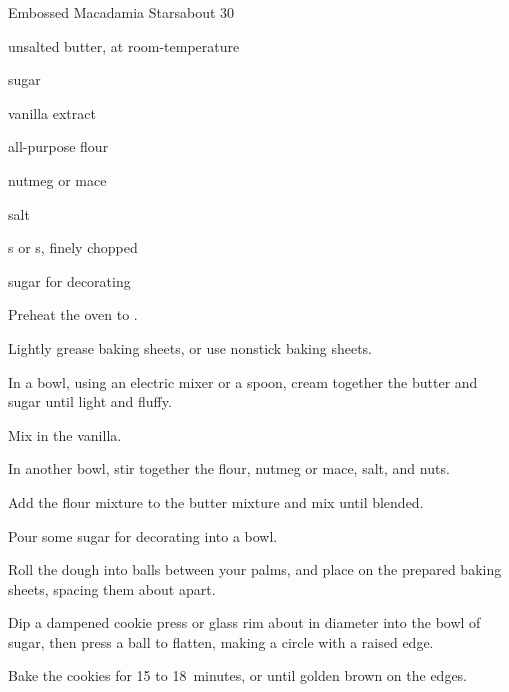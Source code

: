 \begin{recipe}{Embossed Macadamia Stars}{}{about 30}

\begin{ingredients}
\item {} unsalted butter, at room-temperature
\item \C{\half} sugar
\item {} vanilla extract
\item {} all-purpose flour
\item \tp{\half} nutmeg or mace
\item \tp{\eighth} salt
\item \C{\half} s or s, finely chopped
\item sugar for decorating
\end{ingredients}

\begin{directions}
\item Preheat the oven to .
\item Lightly grease baking sheets, or use nonstick baking sheets.
\item In a bowl, using an electric mixer or a spoon, cream together the butter and sugar until light and fluffy.
\item Mix in the vanilla.
\item In another bowl, stir together the flour, nutmeg or mace, salt, and nuts.
\item Add the flour mixture to the butter mixture and mix until blended.
\item Pour some sugar for decorating into a bowl.
\item Roll the dough into \inch{\threequarter}  balls between your palms, and place on the prepared baking sheets, spacing them about  apart.
\item Dip a dampened cookie press or glass rim about \inch{2\quarter} in diameter into the bowl of sugar, then press a ball to flatten, making a circle with a raised edge.
\item Bake the cookies for 15 to 18~minutes, or until golden brown on the edges.
\end{directions}


\end{recipe}
